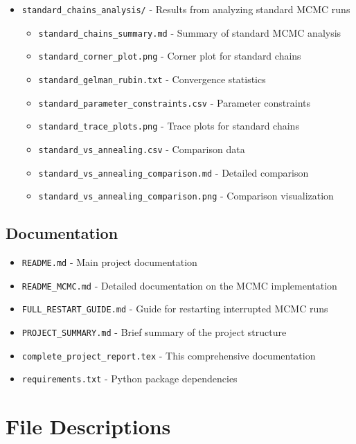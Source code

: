 \documentclass[11pt]{article}
\begin{document}
\begin{itemize}
    \item \texttt{standard\_chains\_analysis/} - Results from analyzing standard MCMC runs
    \begin{itemize}
        \item \texttt{standard\_chains\_summary.md} - Summary of standard MCMC analysis
        \item \texttt{standard\_corner\_plot.png} - Corner plot for standard chains
        \item \texttt{standard\_gelman\_rubin.txt} - Convergence statistics
        \item \texttt{standard\_parameter\_constraints.csv} - Parameter constraints
        \item \texttt{standard\_trace\_plots.png} - Trace plots for standard chains
        \item \texttt{standard\_vs\_annealing.csv} - Comparison data
        \item \texttt{standard\_vs\_annealing\_comparison.md} - Detailed comparison
        \item \texttt{standard\_vs\_annealing\_comparison.png} - Comparison visualization
    \end{itemize}
\end{itemize}

\subsection{Documentation}

\begin{itemize}
    \item \texttt{README.md} - Main project documentation
    \item \texttt{README\_MCMC.md} - Detailed documentation on the MCMC implementation
    \item \texttt{FULL\_RESTART\_GUIDE.md} - Guide for restarting interrupted MCMC runs
    \item \texttt{PROJECT\_SUMMARY.md} - Brief summary of the project structure
    \item \texttt{complete\_project\_report.tex} - This comprehensive documentation
    \item \texttt{requirements.txt} - Python package dependencies
\end{itemize}

\section{File Descriptions}
\end{document}
